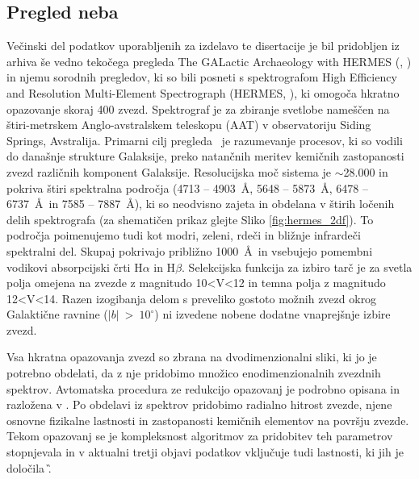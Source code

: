 
\subsection{Pregled neba \Gh}
\label{sec:slo_galah}
Večinski del podatkov uporabljenih za izdelavo te disertacije je bil pridobljen iz arhiva še vedno tekočega pregleda The GALactic Archaeology with HERMES (\Gh, \cite{2015MNRAS.449.2604D}) in njemu sorodnih pregledov, ki so bili posneti s spektrografom High Efficiency and Resolution Multi-Element Spectrograph (HERMES, \cite{2010SPIE.7735E..09B, 2015JATIS...1c5002S}), ki omogoča hkratno opazovanje skoraj 400 zvezd. Spektrograf je za zbiranje svetlobe nameščen na štiri-metrskem Anglo-avstralskem teleskopu (AAT) v observatoriju Siding Springs, Avstralija. Primarni cilj pregleda \Gh\ je razumevanje procesov, ki so vodili do današnje strukture Galaksije, preko natančnih meritev kemičnih zastopanosti zvezd različnih komponent Galaksije. Resolucijska moč sistema je $\sim$28.000 in pokriva štiri spektralna področja (4713 -- 4903~\AA, 5648 -- 5873~\AA, 6478 -- 6737~\AA\ in 7585 -- 7887~\AA), ki so neodvisno zajeta in obdelana v štirih ločenih delih spektrografa (za shematičen prikaz glejte Sliko \ref{fig:hermes_2df}). To področja poimenujemo tudi kot modri, zeleni, rdeči in bližnje infrardeči spektralni del. Skupaj pokrivajo približno 1000~\AA\ in vsebujejo pomembni vodikovi absorpcijski črti H$\alpha$ in H$\beta$. Selekcijska funkcija za izbiro tarč je za svetla polja omejena na zvezde z magnitudo 10<V<12 in temna polja z magnitudo 12<V<14. Razen izogibanja delom s preveliko gostoto možnih zvezd okrog Galaktične ravnine ($|b|$~>~$10^\circ$) ni izvedene nobene dodatne vnaprejšnje izbire zvezd.

Vsa hkratna opazovanja zvezd so zbrana na dvodimenzionalni sliki, ki jo je potrebno obdelati, da z nje pridobimo množico enodimenzionalnih zvezdnih spektrov. Avtomatska procedura ze redukcijo opazovanj je podrobno opisana in razložena v \citet{2017MNRAS.464.1259K}. Po obdelavi iz spektrov pridobimo radialno hitrost zvezde, njene osnovne fizikalne lastnosti in zastopanosti kemičnih elementov na površju zvezde. Tekom opazovanj se je kompleksnost algoritmov za pridobitev teh parametrov stopnjevala in v aktualni tretji objavi podatkov vključuje tudi lastnosti, ki jih je določila \G. 

